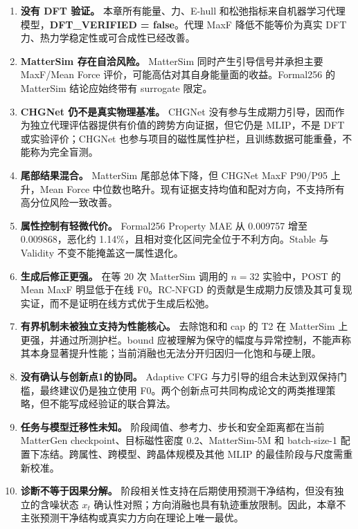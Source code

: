 \begin{enumerate}
\def\labelenumi{\arabic{enumi}.}
\item
  \textbf{没有 DFT 验证。} 本章所有能量、力、E-hull 和松弛指标来自机器学习代理模型，\textbf{DFT\_VERIFIED = false}。代理 MaxF 降低不能等价为真实 DFT 力、热力学稳定性或可合成性已经改善。
\item
  \textbf{Matter\allowbreak Sim 存在自洽风险。} Matter\allowbreak Sim 同时产生引导信号并承担主要 MaxF/Mean Force 评价，可能高估对其自身能量面的收益。Formal256 的 Matter\allowbreak Sim 结论应始终带有 surrogate 限定。
\item
  \textbf{CHGNet 仍不是真实物理基准。} CHGNet 没有参与生成期力引导，因而作为独立代理评估器提供有价值的跨势方向证据，但它仍是 MLIP，不是 DFT 或实验评价；CHGNet 也参与项目的磁性属性护栏，且训练数据可能重叠，不能称为完全盲测。
\item
  \textbf{尾部结果混合。} Matter\allowbreak Sim 尾部总体下降，但 CHGNet MaxF P90/P95 上升，Mean Force 中位数也略升。现有证据支持均值和配对方向，不支持所有高分位风险一致改善。
\item
  \textbf{属性控制有轻微代价。} Formal256 Property MAE 从 0.009757 增至 0.009868，恶化约 1.14\%，且相对变化区间完全位于不利方向。Stable 与 Validity 不变不能掩盖这一属性退化。
\item
  \textbf{生成后修正更强。} 在等 20 次 Matter\allowbreak Sim 调用的 \(n=32\) 实验中，POST 的 Mean MaxF 明显低于在线 F0。RC-NFGD 的贡献是生成期力反馈及其可复现实证，而不是证明在线方式优于生成后松弛。
\item
  \textbf{有界机制未被独立支持为性能核心。} 去除饱和和 cap 的 T2 在 Matter\allowbreak Sim 上更强，并通过所测护栏。bound 应被理解为保守的幅度与异常控制，不能声称其本身显著提升性能；当前消融也无法分开归因归一化饱和与硬上限。
\item
  \textbf{没有确认与创新点1的协同。} Adaptive CFG 与力引导的组合未达到双保持门槛，最终建议仍是独立使用 F0。两个创新点可共同构成论文的两类推理策略，但不能写成经验证的联合算法。
\item
  \textbf{任务与模型迁移性未知。} 阶段阈值、参考力、步长和安全距离都在当前 MatterGen checkpoint、目标磁性密度 0.2、Matter\allowbreak Sim-5M 和 batch-size-1 配置下冻结。跨属性、跨模型、跨晶体规模及其他 MLIP 的最佳阶段与尺度需重新校准。
\item
  \textbf{诊断不等于因果分解。} 阶段相关性支持在后期使用预测干净结构，但没有独立的含噪状态 \(x_t\) 确认性对照；方向消融也具有轨迹重放限制。因此，本章不主张预测干净结构或真实力方向在理论上唯一最优。
\end{enumerate}

